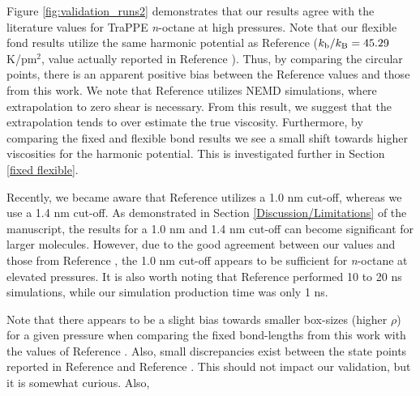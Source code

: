 \documentclass[preprint,review,12pt]{elsarticle}
\begin{document}
	Figure \ref{fig:validation_runs2} demonstrates that our results agree with the literature values for TraPPE \textit{n}-octane at high pressures. Note that our flexible fond results utilize the same harmonic potential as Reference  ($k_{\rm b}/k_{\rm B} = 45.29$ K/pm$^2$, value actually reported in Reference ). Thus, by comparing the circular points, there is an apparent positive bias between the Reference  values and those from this work. We note that Reference  utilizes NEMD simulations, where extrapolation to zero shear is necessary. From this result, we suggest that the extrapolation tends to over estimate the true viscosity. Furthermore, by comparing the fixed and flexible bond results we see a small shift towards higher viscosities for the harmonic potential. This is investigated further in Section \ref{fixed flexible}.
	
	
	
	Recently, we became aware that Reference  utilizes a 1.0 nm cut-off, whereas we use a 1.4 nm cut-off. As demonstrated in Section \ref{Discussion/Limitations} of the manuscript, the results for a 1.0 nm and 1.4 nm cut-off can become significant for larger molecules. However, due to the good agreement between our values and those from Reference , the 1.0 nm cut-off appears to be sufficient for \textit{n}-octane at elevated pressures. It is also worth noting that Reference  performed 10 to 20 ns simulations, while our simulation production time was only 1 ns.
	
	Note that there appears to be a slight bias towards smaller box-sizes (higher $\rho$) for a given pressure when comparing the fixed bond-lengths from this work with the values of Reference . Also, small discrepancies exist between the state points reported in Reference  and Reference . This should not impact our validation, but it is somewhat curious. Also,  
	
\end{document}
